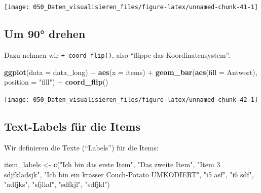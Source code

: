 \documentclass[12pt,]{book}
\makeatletter
\newenvironment{Shaded}{\begin{snugshade}}{\end{snugshade}}
\newcommand{\KeywordTok}[1]{\textcolor[rgb]{0.13,0.29,0.53}{\textbf{{#1}}}}
\newcommand{\DataTypeTok}[1]{\textcolor[rgb]{0.13,0.29,0.53}{{#1}}}
\newcommand{\StringTok}[1]{\textcolor[rgb]{0.31,0.60,0.02}{{#1}}}
\newcommand{\NormalTok}[1]{{#1}}
\newenvironment{kframe}{%
\medskip{}
\setlength{\fboxsep}{.8em}
 \def\at@end@of@kframe{}%
 \ifinner\ifhmode%
  \def\at@end@of@kframe{\end{minipage}}%
  \begin{minipage}{\columnwidth}%
 \fi\fi%
 \def\FrameCommand##1{\hskip\@totalleftmargin \hskip-\fboxsep
 \colorbox{shadecolor}{##1}\hskip-\fboxsep
     \hskip-\linewidth \hskip-\@totalleftmargin \hskip\columnwidth}%
 \MakeFramed {\advance\hsize-\width
   \@totalleftmargin\z@ \linewidth\hsize
   \@setminipage}}%
 {\par\unskip\endMakeFramed%
 \at@end@of@kframe}
\renewenvironment{Shaded}{\begin{kframe}}{\end{kframe}}
\makeatother
\begin{document}
\begin{center}\texttt{[image: 050\_Daten\_visualisieren\_files/figure-latex/unnamed-chunk-41-1]} \end{center}

\subsection{Um 90° drehen}\label{um-90-drehen}

Dazu nehmen wir \texttt{+\ coord\_flip()}, also ``flippe das
Koordinatensystem''.

\begin{Shaded}
\begin{Highlighting}[]
\KeywordTok{ggplot}\NormalTok{(}\DataTypeTok{data =} \NormalTok{data_long) +}
\StringTok{  }\KeywordTok{aes}\NormalTok{(}\DataTypeTok{x =} \NormalTok{items)  +}
\StringTok{  }\KeywordTok{geom_bar}\NormalTok{(}\KeywordTok{aes}\NormalTok{(}\DataTypeTok{fill =} \NormalTok{Antwort), }\DataTypeTok{position =} \StringTok{"fill"}\NormalTok{) +}
\StringTok{  }\KeywordTok{coord_flip}\NormalTok{()}
\end{Highlighting}
\end{Shaded}

\begin{center}\texttt{[image: 050\_Daten\_visualisieren\_files/figure-latex/unnamed-chunk-42-1]} \end{center}

\subsection{Text-Labels für die Items}\label{text-labels-fur-die-items}

Wir definieren die Texte (``Labels'') für die Items:

\begin{Shaded}
\begin{Highlighting}[]
\NormalTok{item_labels <-}\StringTok{ }\KeywordTok{c}\NormalTok{(}\StringTok{"Ich bin das erste Item"}\NormalTok{,}
                 \StringTok{"Das zweite Item"}\NormalTok{,}
                 \StringTok{"Item 3 sdjfkladsjk"}\NormalTok{,}
                 \StringTok{"Ich bin ein krasser Couch-Potato UMKODIERT"}\NormalTok{,}
\StringTok{"i5 asf"}\NormalTok{, }\StringTok{"i6 sdf"}\NormalTok{, }\StringTok{"adfjks"}\NormalTok{, }\StringTok{"sfjlkd"}\NormalTok{, }\StringTok{"sdfkjl"}\NormalTok{, }\StringTok{"sdfjkl"}\NormalTok{)}
\end{Highlighting}
\end{Shaded}
\end{document}
